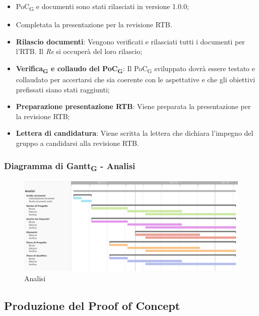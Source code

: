 \:
\begin{itemize}
	\item PoC\textsubscript{G} e documenti sono stati rilasciati in versione 1.0.0;
	\item Completata la presentazione per la revisione RTB.
\end{itemize}

\:
\begin{itemize}
	\item \textbf{Rilascio documenti}: Vengono verificati e rilasciati tutti i documenti per l'RTB. Il \textit{Re} si occuperà del loro rilascio;
	\item \textbf{Verifica\textsubscript{G} e collaudo del PoC\textsubscript{G}}: Il PoC\textsubscript{G} sviluppato dovrà essere testato e collaudato per accertarsi che sia coerente con le aspettative e che gli obiettivi prefissati siano stati raggiunti;
	\item \textbf{Preparazione presentazione RTB}: Viene preparata la presentazione per la revisione RTB;
	\item \textbf{Lettera di candidatura}: Viene scritta la lettera che dichiara l'impegno del gruppo a candidarsi alla revisione RTB.
\end{itemize}

\subsubsection{Diagramma di Gantt\textsubscript{G} - Analisi}

\begin{figure}[H]
\centering
\includegraphics[width=\textwidth]{img/4_analisi.png}
\caption{Analisi}
\end{figure}

\subsection{Produzione del Proof of Concept}
